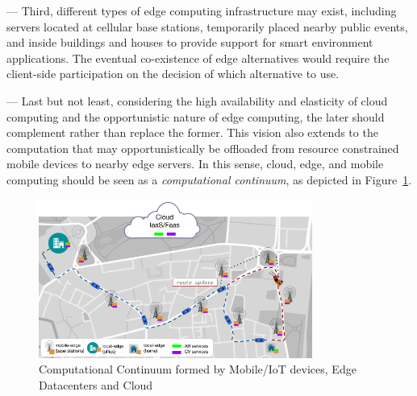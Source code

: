
--- Third, different types of edge computing infrastructure may exist, including servers located at cellular base stations, temporarily placed nearby public events, and inside buildings and houses to provide support for smart environment applications. The eventual co-existence of edge alternatives would require the client-side participation on the decision of which alternative to use.

--- Last but not least, considering the high availability and elasticity of cloud computing and the opportunistic nature of edge computing, the later should complement rather than replace the former. This vision also extends to the computation that may opportunistically be offloaded from resource constrained mobile devices to nearby edge servers. In this sense, cloud, edge, and mobile computing should be seen as a \textit{computational continuum}, as depicted in Figure~\ref{fig:continuum-intro}.

\begin{figure}[tbp]
	\includegraphics[width=0.8\textwidth]{figs/continuum.png}
	\caption{Computational Continuum formed by Mobile/IoT devices, Edge Datacenters and Cloud}
	\label{fig:continuum-intro}
\end{figure}

 



